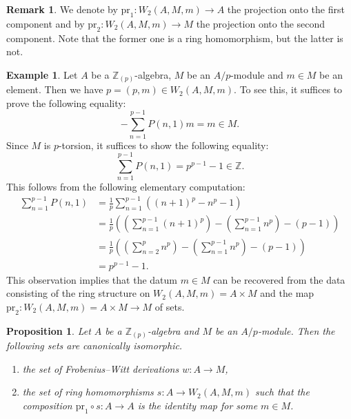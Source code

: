 \documentclass[11pt, a4paper]{amsart}
\theoremstyle{plain}
\newtheorem{prop}[theorem]{Proposition}
\theoremstyle{definition}
\newtheorem{remark}[theorem]{Remark}
\newtheorem{example}[theorem]{Example}
\begin{document}
    

\begin{remark}\label{rem2.6}
    We denote by $\mathrm{pr}_1:W_2(A,M,m)\to A$ the projection onto the first component and by $\mathrm{pr}_2:W_2(A,M,m)\to M$ the projection onto the second component. Note that the former one is a ring homomorphism, but the latter is not.
\end{remark}
\begin{example}\label{exa2.7}
    Let $A$ be a $\mathbb Z_{(p)}$-algebra, $M$ be an $A/p$-module and $m\in M$ be an element. Then we have $p=(p,m)\in W_2(A,M,m)$. To see this, it suffices to prove the following equality:\[-\sum_{n=1}^{p-1}P(n,1)m=m\in M.\] Since $M$ is $p$-torsion, it suffices to show the following equality:\[\sum_{n=1}^{p-1}P(n,1)=p^{p-1}-1\in \mathbb Z.\] This follows from the following elementary computation:\begin{align*}
        \sum_{n=1}^{p-1}P(n,1)&=\frac{1}{p}\sum_{n=1}^{p-1}((n+1)^p-n^p-1)\\&=\frac{1}{p}((\sum_{n=1}^{p-1}(n+1)^p)-(\sum_{n=1}^{p-1}n^p)-(p-1))\\&=\frac{1}{p}((\sum_{n=2}^{p}n^p)-(\sum_{n=1}^{p-1}n^p)-(p-1))\\&=p^{p-1}-1.
    \end{align*}
    This observation implies that the datum $m\in M$ can be recovered from the data consisting of the ring structure on $W_2(A,M,m)=A\times M$ and the map $\mathrm{pr}_2:W_2(A,M,m)=A\times M\to M$ of sets.
\end{example}
\begin{prop}\label{pro2.8}
    Let $A$ be a $\mathbb Z_{(p)}$-algebra and $M$ be an $A/p$-module. Then the following sets are canonically isomorphic.\begin{enumerate}
        \item the set of Frobenius--Witt derivations $w:A\to M$,
        \item the set of ring homomorphisms $s:A\to W_2(A,M,m)$ such that the composition $\mathrm{pr}_1\circ s:A\to A$ is the identity map for some $m\in M$.
    \end{enumerate}
\end{prop}
\end{document}
